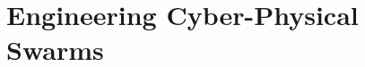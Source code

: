 \documentclass[12pt,a4paper,oneside]{book}
\begin{document}
\part{Engineering Cyber-Physical Swarms}
\begin{refsection}\end{refsection}
\begin{refsection}\end{refsection}
\begin{refsection}\end{refsection}
\begin{refsection}\end{refsection}
\begin{refsection}\end{refsection}
\begin{refsection}\end{refsection}

\begin{refsection}\end{refsection}
\end{document}
